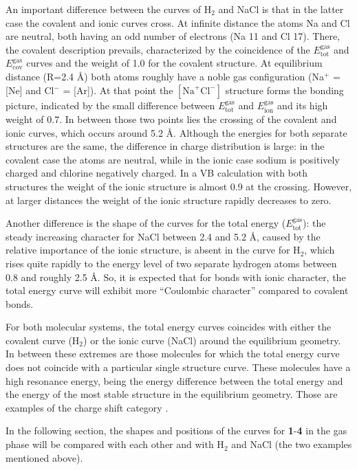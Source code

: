 An important difference between the curves of H$_2$ and NaCl is that in the latter case the covalent and ionic curves cross. At infinite distance the atoms Na and Cl are neutral, both having an odd number of electrons (Na 11 and Cl 17). There, the covalent description prevails, characterized by the coincidence of the $E_\mathrm{tot}^\mathrm{gas}$ and $E_\mathrm{cov}^\mathrm{gas}$ curves and the weight of 1.0 for the covalent structure. At equilibrium distance (R=2.4 \AA) both atoms roughly have a noble gas configuration (Na$^{+}$ = [Ne] and Cl$^{-}$ = [Ar]). At that point the $[\mathrm{Na}^{+}\mathrm{Cl}^{-}]$ structure forms the bonding picture, indicated by the small difference between $E_\mathrm{tot}^\mathrm{gas}$ and $E_\mathrm{ion}^\mathrm{gas}$ and its high weight of 0.7. In between those two points lies the crossing of the covalent and ionic curves, which occurs around 5.2 \AA. Although the energies for both separate structures are the same, the difference in charge distribution is large: in the covalent case the atoms are neutral, while in the ionic case sodium is positively charged and chlorine negatively charged. In a VB calculation with both structures the weight of the ionic structure is almost 0.9 at the crossing. However, at larger distances the weight of the ionic structure rapidly decreases to zero.

Another difference is the shape of the curves for the total energy ($E_\mathrm{tot}^\mathrm{gas}$): the steady increasing character for NaCl between 2.4 and 5.2 \AA, caused by the relative importance of the ionic structure, is absent in the curve for H$_2$, which rises quite rapidly to the energy level of two separate hydrogen atoms between 0.8 and roughly 2.5 \AA. So, it is expected that for bonds with ionic character, the total energy curve will exhibit more ``Coulombic character'' compared to covalent bonds. 

For both molecular systems, the total energy curves coincides with either the covalent curve (H$_2$) or the ionic curve (NaCl) around the equilibrium geometry. In between these extremes are those molecules for which the total energy curve does not coincide with a particular single structure curve. These molecules have a high resonance energy, being the energy difference between the total energy and the energy of the most stable structure in the equilibrium geometry. Those are examples of the charge shift category \cite{cs1,cs2}.

In the following section, the shapes and positions of the curves for \textbf{1}-\textbf{4} in the gas phase will be compared with each other and with H$_2$ and NaCl (the two examples mentioned above).

